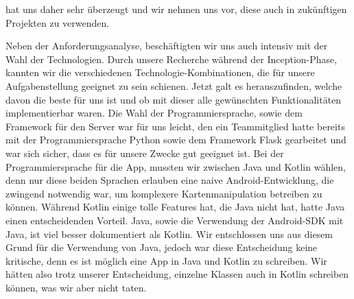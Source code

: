 \documentclass[10pt]{article}
\begin{document}
hat uns daher sehr überzeugt und wir nehmen uns vor, diese auch in zukünftigen Projekten zu verwenden.\par
\medskip
Neben der Anforderungsanalyse, beschäftigten wir uns auch intensiv mit der Wahl der Technologien.
Durch unsere Recherche während der Inception-Phase, kannten wir die verschiedenen Technologie-Kombinationen,
die für unsere Aufgabenstellung geeignet zu sein schienen. Jetzt galt es herauszufinden, welche davon die beste für uns
ist und ob mit dieser alle gewünschten Funktionalitäten implementierbar waren. Die Wahl der Programmiersprache,
sowie dem Framework für den Server war für uns leicht, den ein Teammitglied hatte bereits mit der Programmiersprache
Python sowie dem Framework Flask gearbeitet und war sich sicher, dass es für unsere Zwecke gut geeignet ist.
Bei der Programmiersprache für die App, mussten wir zwischen Java und Kotlin wählen, denn nur diese beiden Sprachen
erlauben eine naive Android-Entwicklung, die zwingend notwendig war, um komplexere Kartenmanipulation betreiben zu können.
Während Kotlin einige tolle Features hat, die Java nicht hat, hatte Java einen entscheidenden Vorteil.
Java, sowie die Verwendung der Android-SDK mit Java, ist viel besser dokumentiert als Kotlin.
Wir entschlossen uns aus diesem Grund für die Verwendung von Java, jedoch war diese Entscheidung keine kritische,
denn es ist möglich eine App in Java und Kotlin zu schreiben. Wir hätten also trotz unserer Entscheidung,
einzelne Klassen auch in Kotlin schreiben können, was wir aber nicht taten.
\end{document}
